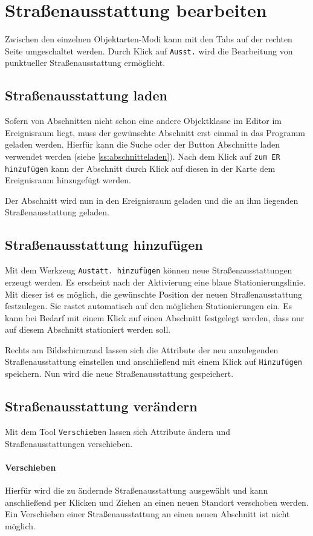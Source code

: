 \documentclass[a4paper,11pt,bibliography=totoc, listof=totoc,titlepage]{scrartcl}
\begin{document}
\section{Straßenausstattung bearbeiten}
\label{s:straus}
Zwischen den einzelnen Objektarten-Modi kann mit den Tabs auf der rechten Seite umgeschaltet werden. Durch Klick auf \verb|Ausst.| wird die Bearbeitung von punktueller Straßenausstattung ermöglicht.

\subsection{Straßenausstattung laden}
Sofern von Abschnitten nicht schon eine andere Objektklasse im Editor im Ereignisraum liegt, muss der gewünschte Abschnitt erst einmal in das Programm geladen werden. Hierfür kann die Suche oder der Button Abschnitte laden verwendet werden (siehe \autoref{ss:abschnitteladen}). Nach dem Klick auf \verb|zum ER hinzufügen| kann der Abschnitt durch Klick auf diesen in der Karte dem Ereignisraum hinzugefügt werden.

Der Abschnitt wird nun in den Ereignisraum geladen und die an ihm liegenden Straßenausstattung geladen.

\subsection{Straßenausstattung hinzufügen}
Mit dem Werkzeug \verb|Austatt. hinzufügen| können neue Straßenausstattungen erzeugt werden. Es erscheint nach der Aktivierung eine blaue Stationierungslinie. Mit dieser ist es möglich, die gewünschte Position der neuen Straßenausstattung festzulegen. Sie rastet automatisch auf den möglichen Stationierungen ein. Es kann bei Bedarf mit einem Klick auf einen Abschnitt festgelegt werden, dass nur auf diesem Abschnitt stationiert werden soll.

Rechts am Bildschirmrand lassen sich die Attribute der neu anzulegenden Straßenausstattung einstellen und anschließend mit einem Klick auf \verb|Hinzufügen| speichern. Nun wird die neue Straßenausstattung gespeichert.

\subsection{Straßenausstattung verändern}
Mit dem Tool \verb|Verschieben| lassen sich Attribute ändern und Straßenausstattungen verschieben. 

\paragraph{Verschieben} 
Hierfür wird die zu ändernde Straßenausstattung ausgewählt und kann anschließend per Klicken und Ziehen an einen neuen Standort verschoben werden. Ein Verschieben einer Straßenausstattung an einen neuen Abschnitt ist nicht möglich.
\end{document}
